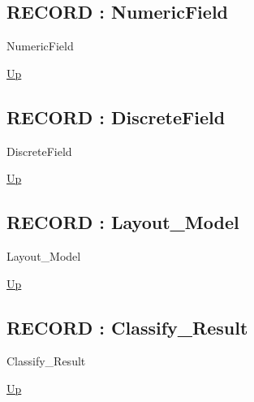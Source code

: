 \par
\par
\subsection*{RECORD : NumericField}
\hypertarget{ecldoc:ml_core.types.numericfield}{}
\begin{minipage}[t]{\textwidth}
\begin{flushleft}
 NumericField 
\end{flushleft}
\end{minipage}
\hyperlink{ecldoc:ML_Core.Types}{Up}

\par
\par
\subsection*{RECORD : DiscreteField}
\hypertarget{ecldoc:ml_core.types.discretefield}{}
\begin{minipage}[t]{\textwidth}
\begin{flushleft}
 DiscreteField 
\end{flushleft}
\end{minipage}
\hyperlink{ecldoc:ML_Core.Types}{Up}

\par
\par
\subsection*{RECORD : Layout\_Model}
\hypertarget{ecldoc:ml_core.types.layout_model}{}
\begin{minipage}[t]{\textwidth}
\begin{flushleft}
 Layout\_Model 
\end{flushleft}
\end{minipage}
\hyperlink{ecldoc:ML_Core.Types}{Up}

\par
\par
\subsection*{RECORD : Classify\_Result}
\hypertarget{ecldoc:ml_core.types.classify_result}{}
\begin{minipage}[t]{\textwidth}
\begin{flushleft}
 Classify\_Result 
\end{flushleft}
\end{minipage}
\hyperlink{ecldoc:ML_Core.Types}{Up}


